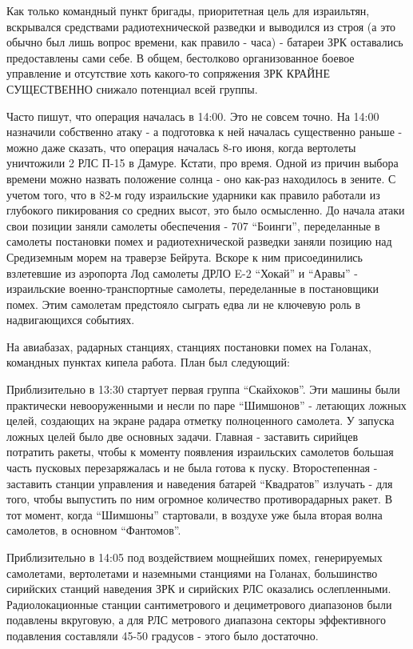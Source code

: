 Как только командный пункт бригады, приоритетная цель для израильтян, вскрывался средствами радиотехнической разведки и выводился из строя (а это обычно был лишь вопрос времени, как правило - часа) - батареи ЗРК оставались предоставлены сами себе. В общем, бестолково организованное боевое управление и отсутствие хоть какого-то сопряжения ЗРК КРАЙНЕ СУЩЕСТВЕННО снижало потенциал всей группы.

Часто пишут, что операция началась в 14:00. Это не совсем точно. На 14:00 назначили собственно атаку - а подготовка к ней началась существенно раньше - можно даже сказать, что операция началась 8-го июня, когда вертолеты уничтожили 2 РЛС П-15 в Дамуре. Кстати, про время. Одной из причин выбора времени можно назвать положение солнца - оно как-раз находилось в зените. С учетом того, что в 82-м году израильские ударники как правило работали из глубокого пикирования со средних высот, это было осмысленно. До начала атаки свои позиции заняли самолеты обеспечения - 707 “Боинги”, переделанные в самолеты постановки помех и радиотехнической разведки заняли позицию над Средиземным морем на траверзе Бейрута. Вскоре к ним присоединились взлетевшие из аэропорта Лод самолеты ДРЛО E-2 “Хокай” и “Аравы” - израильские военно-транспортные самолеты, переделанные в постановщики помех. Этим самолетам предстояло сыграть едва ли не ключевую роль в надвигающихся событиях.

На авиабазах, радарных станциях, станциях постановки помех на Голанах, командных пунктах кипела работа. План был следующий:

Приблизительно в 13:30 стартует первая группа “Скайхоков”. Эти машины были практически невооруженными и несли по паре “Шимшонов” - летающих ложных целей, создающих на экране радара отметку полноценного самолета. У запуска ложных целей было две основных задачи. Главная - заставить сирийцев потратить ракеты, чтобы к моменту появления израильских самолетов большая часть пусковых перезаряжалась и не была готова к пуску. Второстепенная - заставить станции управления и наведения батарей “Квадратов” излучать - для того, чтобы выпустить по ним огромное количество противорадарных ракет. В тот момент, когда “Шимшоны” стартовали, в воздухе уже была вторая волна самолетов, в основном “Фантомов”.

Приблизительно в 14:05 под воздействием мощнейших помех, генерируемых самолетами, вертолетами и наземными станциями на Голанах, большинство сирийских станций наведения ЗРК и сирийских РЛС оказались ослепленными. Радиолокационные станции сантиметрового и дециметрового диапазонов были подавлены вкруговую, а для РЛС метрового диапазона секторы эффективного подавления составляли 45-50 градусов - этого было достаточно.


